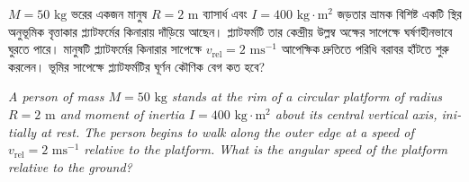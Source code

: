\documentclass[12pt, a4paper]{article}
\begin{document}
\newpage

\begin{tcolorbox}[questionbox={প্রশ্ন (Question) 35}]
    \noindent
    $M = 50\text{ kg}$ ভরের একজন মানুষ $R = 2\text{ m}$ ব্যাসার্ধ এবং $I = 400\text{ kg}\cdot\text{m}^2$ জড়তার ভ্রামক বিশিষ্ট একটি স্থির অনুভূমিক বৃত্তাকার প্ল্যাটফর্মের কিনারায় দাঁড়িয়ে আছেন। প্ল্যাটফর্মটি তার কেন্দ্রীয় উল্লম্ব অক্ষের সাপেক্ষে ঘর্ষণহীনভাবে ঘুরতে পারে। মানুষটি প্ল্যাটফর্মের কিনারার সাপেক্ষে $v_{\text{rel}} = 2\text{ ms}^{-1}$ আপেক্ষিক দ্রুতিতে পরিধি বরাবর হাঁটতে শুরু করলেন। ভূমির সাপেক্ষে প্ল্যাটফর্মটির ঘূর্ণন কৌণিক বেগ কত হবে?
    
    \vspace{0.8em}
    \begin{english}
    \noindent\textit{\color{darkgray}
    A person of mass $M = 50\text{ kg}$ stands at the rim of a circular platform of radius $R = 2\text{ m}$ and moment of inertia $I = 400\text{ kg}\cdot\text{m}^2$ about its central vertical axis, initially at rest. The person begins to walk along the outer edge at a speed of $v_{\text{rel}} = 2\text{ ms}^{-1}$ relative to the platform. What is the angular speed of the platform relative to the ground?
    }
    \end{english}
\end{tcolorbox}

\vspace{1em}
\begin{center}
\end{center}
\vspace{1em}
\end{document}
